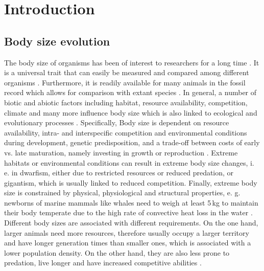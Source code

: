 \section{Introduction}
\subsection{Body size evolution}

The body size of organisms has been of interest to researchers for a long time \citep{Haldane1928,Peters1983}. It is a universal trait that can easily be measured and compared among different organisms \citep{.}. Furthermore, it is readily available for many animals in the fossil record which allows for comparison with extant species \citep{.}. In general, a number of biotic and abiotic factors including habitat, resource availability, competition, climate and many more influence body size which is also linked to ecological and evolutionary processes \citep{Blackburn1994a,Blueweiss1978,Smith2009}.
Specifically, Body size is dependent on resource availability, intra- and interspecific competition and environmental conditions during development, genetic predisposition, and a trade-off between costs of early vs. late maturation, namely investing in growth or reproduction \citep{Stearns2000}. Extreme habitats or environmental conditions can result in extreme body size changes, i. e. in dwarfism, either due to restricted resources or reduced predation, or gigantism, which is usually linked to reduced competition. Finally, extreme body size is constrained by physical, physiological and structural properties, e. g. newborns of marine mammals like whales need to weigh at least 5\,kg to maintain their body temperate due to the high rate of convective heat loss in the water \citep{Downhower1988,Smith2016}.
Different body sizes are associated with different requirements. On the one hand, larger animals need more resources, therefore usually occupy a larger territory and have longer generation times than smaller ones, which is associated with a lower population density. On the other hand, they are also less prone to predation, live longer and have increased competitive abilities \citep{Stearn2000, Smith2016}. 



